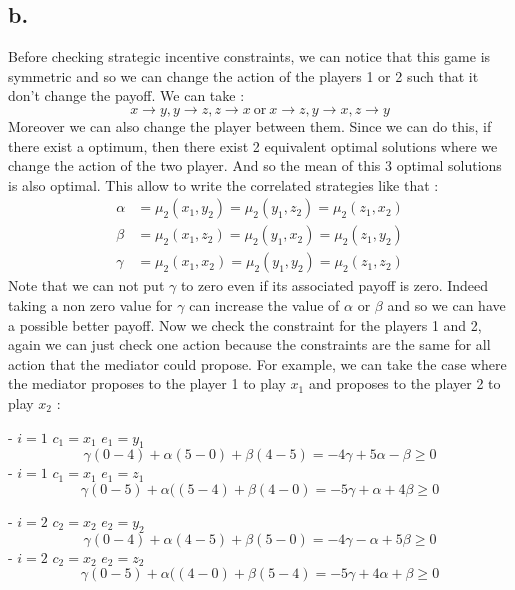 \subsection*{b.}

Before checking strategic incentive constraints, we can notice that this game is symmetric and so we can change the action of the players 1 or 2 such that it don't change the payoff. We can take :
\begin{equation*}
    x \rightarrow y,y \rightarrow z, z \rightarrow x \ \mbox{or} \ x \rightarrow z, y \rightarrow x, z \rightarrow y
\end{equation*} Moreover we can also change the player between them. Since we can do this, if there exist a optimum, then there exist 2 equivalent optimal solutions where we change the action of the two player. And so the mean of this 3 optimal solutions is also optimal. This allow to write the correlated strategies like that :
\begin{align*}
    \alpha &= \mu_2(x_1,y_2) = \mu_2(y_1,z_2) = \mu_2(z_1,x_2) \\
    \beta &= \mu_2(x_1,z_2) = \mu_2(y_1,x_2) = \mu_2(z_1,y_2)
    \\
    \gamma &= \mu_2(x_1,x_2) = \mu_2(y_1,y_2) = \mu_2(z_1,z_2)
\end{align*}
Note that we can not put $\gamma$ to zero even if its associated payoff is zero. Indeed taking a non zero value for $\gamma$ can increase the value of $\alpha$ or $\beta$ and so we can have a possible better payoff.
Now we check the constraint for the players 1 and 2, again we can just check one action because the constraints are the same for all action that the mediator could propose. For example, we can take the case where the mediator proposes to the player 1 to play $x_1$ and proposes to the player 2 to play $x_2$ :

- $i=1$ $c_1=x_1$  $e_1=y_1$
\begin{equation*}
    \gamma(0-4) + \alpha(5-0) + \beta(4-5) = -4\gamma + 5\alpha - \beta \ge 0
\end{equation*}
- $i=1$ $c_1=x_1$  $e_1=z_1$
\begin{equation*}
    \gamma(0-5) + \alpha((5-4) + \beta(4-0) = -5\gamma + \alpha + 4\beta \ge 0
\end{equation*}

- $i=2$ $c_2=x_2$  $e_2=y_2$
\begin{equation*}
    \gamma(0-4) + \alpha(4-5) + \beta(5-0) = -4\gamma - \alpha + 5\beta \ge 0
\end{equation*}
- $i=2$ $c_2=x_2$  $e_2=z_2$
\begin{equation*}
    \gamma(0-5) + \alpha((4-0) + \beta(5-4) = -5\gamma + 4\alpha + \beta \ge 0
\end{equation*}

